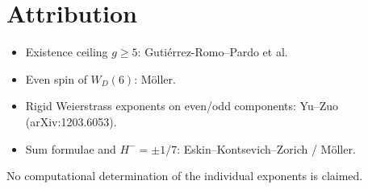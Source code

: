 \documentclass[11pt,a4paper]{article}
\begin{document}
\section{Attribution}
\begin{itemize}
\item Existence ceiling \(g\ge 5\): Guti\'errez-Romo--Pardo et al.
\item Even spin of \(W_D(6)\): M\"oller.
\item Rigid Weierstrass exponents on even/odd components: Yu--Zuo
  (arXiv:1203.6053).
\item Sum formulae and \(H^-=\pm 1/7\): Eskin--Kontsevich--Zorich / M\"oller.
\end{itemize}
No computational determination of the individual exponents is claimed.
\end{document}
